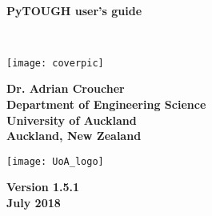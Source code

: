 \begin{titlepage}

\begin{center}

\bigskip\

\textbf{\Huge{PyTOUGH user's guide}}

\bigskip\

\texttt{[image: coverpic]}

\bigskip

\textbf{\large{Dr. Adrian Croucher\\
Department of Engineering Science\\
University of Auckland\\
Auckland, New Zealand}}

\bigskip
\bigskip
\bigskip

\texttt{[image: UoA\_logo]}

\bigskip
\bigskip
\bigskip
\bigskip

\textbf{\large{Version 1.5.1\\July 2018}}

\end{center}
\end{titlepage}

